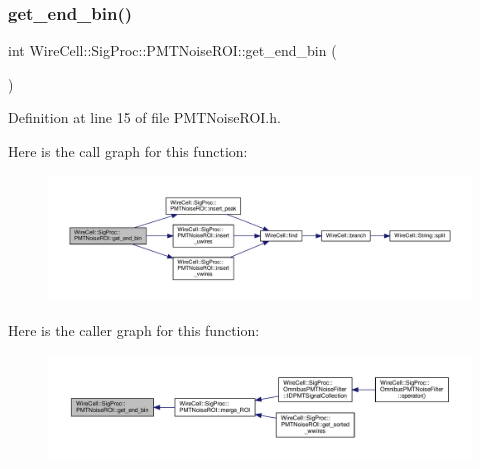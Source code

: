 \subsubsection{\texorpdfstring{get\+\_\+end\+\_\+bin()}{get\_end\_bin()}}
{\footnotesize\ttfamily int Wire\+Cell\+::\+Sig\+Proc\+::\+P\+M\+T\+Noise\+R\+O\+I\+::get\+\_\+end\+\_\+bin (\begin{DoxyParamCaption}{ }\end{DoxyParamCaption})\hspace{0.3cm}{\ttfamily [inline]}}



Definition at line 15 of file P\+M\+T\+Noise\+R\+O\+I.\+h.

Here is the call graph for this function\+:
\nopagebreak
\begin{figure}[H]
\begin{center}
\leavevmode
\includegraphics[width=350pt]{class_wire_cell_1_1_sig_proc_1_1_p_m_t_noise_r_o_i_a33db997dd906db5cb63ba630e9d0f882_cgraph}
\end{center}
\end{figure}
Here is the caller graph for this function\+:
\nopagebreak
\begin{figure}[H]
\begin{center}
\leavevmode
\includegraphics[width=350pt]{class_wire_cell_1_1_sig_proc_1_1_p_m_t_noise_r_o_i_a33db997dd906db5cb63ba630e9d0f882_icgraph}
\end{center}
\end{figure}
\mbox{\label{class_wire_cell_1_1_sig_proc_1_1_p_m_t_noise_r_o_i_a44c13f88197acd2204d17bc2b9b75f3e}} 
